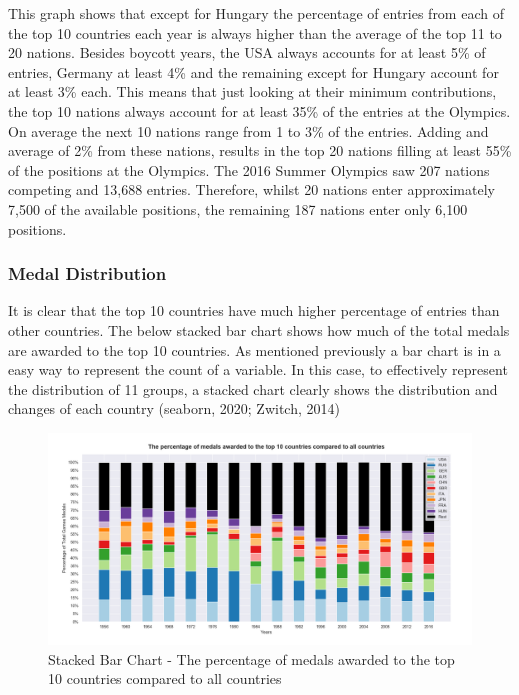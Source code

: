 \documentclass[a4 paper, 12pt]{article}
\begin{document}
        This graph shows that except for Hungary the percentage of entries from each of the top 10 countries each year is always higher than the average of the top 11 to 20 nations. Besides boycott years, the USA always accounts for at least 5\% of entries, Germany at least 4\% and the remaining except for Hungary account for at least 3\% each. This means that just looking at their minimum contributions, the top 10 nations always account for at least 35\% of the entries at the Olympics. On average the next 10 nations range from 1 to 3\% of the entries. Adding and average of 2\% from these nations, results in the top 20 nations filling at least 55\% of the positions at the Olympics. The 2016 Summer Olympics saw 207 nations competing and 13,688 entries. Therefore, whilst 20 nations enter approximately 7,500 of the available positions, the remaining 187 nations enter only 6,100 positions.


        \subsubsection{Medal Distribution}
        It is clear that the top 10 countries have much higher percentage of entries than other countries. The below stacked bar chart shows how much of the total medals are awarded to the top 10 countries. As mentioned previously a bar chart is in a easy way to represent the count of a variable. In this case, to effectively represent the distribution of 11 groups, a stacked chart clearly shows the distribution and changes of each country (seaborn, 2020; Zwitch, 2014)

        \begin{figure} [H]
            \centering
            \includegraphics[width=\textwidth, frame]
                {./images/graph/countries_medals_stacked.png}      
                \caption{Stacked Bar Chart - The percentage of medals awarded to the top 10 countries compared to all countries} 
        \end{figure}
\end{document}

